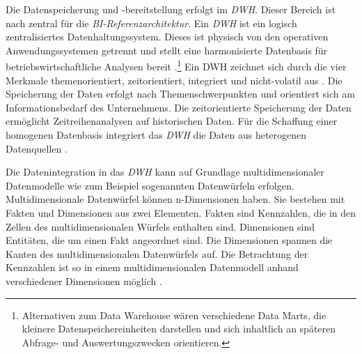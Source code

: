 Die Datenspeicherung und -bereitstellung erfolgt im \textit{\acrshort{DWH}}. Dieser Bereich ist nach \citeauthor{linden_geschaftsmodellbasierte_2016} zentral für die 
\textit{\acrshort{BI}-Referenzarchitektur}\cite[vgl.][135]{linden_geschaftsmodellbasierte_2016}. Ein \textit{\acrlong{DWH}} ist ein logisch zentralisiertes Datenhaltungssystem. Dieses ist physisch 
von den operativen Anwendungssystemen getrennt und stellt eine harmonisierte Datenbasis für betriebswirtschaftliche Analysen bereit \cite[vgl.][135]{mucksch_data_2000}.\footnote{Alternativen zum Data Warehouse wären verschiedene Data Marts, 
die kleinere Datenspeichereinheiten darstellen und sich inhaltlich an späteren Abfrage- und Auswertungszwecken orientieren.} 
Ein \acrlong{DWH} zeichnet sich durch die vier Merkmale themenorientiert, zeitorientiert, integriert und nicht-volatil aus \cites[vgl.][29 f.]{inmon_building_nodate_2005}[vgl.][271 f.]{abts_grundkurs_2017}[vgl.][136 f. ]{linden_geschaftsmodellbasierte_2016}. Die Speicherung der Daten erfolgt nach Themenschwerpunkten und
orientiert sich am Informationsbedarf des Unternehmens. Die zeitorientierte Speicherung der Daten ermöglicht Zeitreihenanalysen auf historischen Daten. 
Für die Schaffung einer homogenen Datenbasis integriert das \textit{\acrshort{DWH}} die Daten aus heterogenen Datenquellen \cite[vgl.][136]{linden_geschaftsmodellbasierte_2016}.

Die Datenintegration in das \textit{\acrlong{DWH}} kann auf Grundlage  multidimensionaler Datenmodelle wie zum Beispiel sogenannten Datenwürfeln erfolgen. 
Multidimensionale Datenwürfel können n-Dimensionen haben. Sie bestehen mit Fakten und Dimensionen aus zwei Elementen. 
Fakten sind Kennzahlen, die in den Zellen des multidimensionalen Würfels enthalten sind.
Dimensionen sind Entitäten, die um einen Fakt angeordnet sind. Die Dimensionen spannen die Kanten des multidimensionalen Datenwürfels auf.
Die Betrachtung der Kennzahlen ist so in einem multidimensionalen Datenmodell anhand verschiedener Dimensionen möglich 
\cites[vgl.][13 ff., 21 f.]{farkisch_data-warehouse-systeme_2011}[vgl.][66 f.]{kemper_business_2010}.

